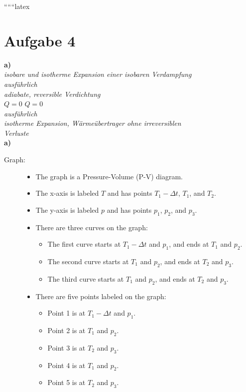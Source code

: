 
``````latex


\section*{Aufgabe 4}

\textbf{a)} \\
\textit{isobare und isotherme Expansion einer isobaren Verdampfung} \\
\textit{ausführlich} \\
\textit{adiabate, reversible Verdichtung} \\
$Q=0$ \quad $Q=0$ \\

\textit{ausführlich} \\
\textit{isotherme Expansion, Wärmeübertrager ohne irreversiblen} \\
\textit{Verluste} \\

\textbf{a)} \\

\begin{description}
    \item[Graph:] 
    \begin{itemize}
        \item The graph is a Pressure-Volume (P-V) diagram.
        \item The x-axis is labeled $T$ and has points $T_1 - \Delta t$, $T_1$, and $T_2$.
        \item The y-axis is labeled $p$ and has points $p_1$, $p_2$, and $p_3$.
        \item There are three curves on the graph:
        \begin{itemize}
            \item The first curve starts at $T_1 - \Delta t$ and $p_1$, and ends at $T_1$ and $p_2$.
            \item The second curve starts at $T_1$ and $p_2$, and ends at $T_2$ and $p_3$.
            \item The third curve starts at $T_1$ and $p_2$, and ends at $T_2$ and $p_3$.
        \end{itemize}
        \item There are five points labeled on the graph:
        \begin{itemize}
            \item Point 1 is at $T_1 - \Delta t$ and $p_1$.
            \item Point 2 is at $T_1$ and $p_2$.
            \item Point 3 is at $T_2$ and $p_3$.
            \item Point 4 is at $T_1$ and $p_2$.
            \item Point 5 is at $T_2$ and $p_3$.
        \end{itemize}
    \end{itemize}
\end{description}

